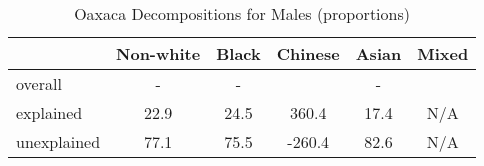 \begin{table}[htbp]\centering
\caption{Oaxaca Decompositions for Males (proportions)}
\begin{tabular}{l*{5}{c}}
\hline\hline
          &Non-white&    Black&  Chinese&    Asian&    Mixed\\
\hline
overall   &     -    &      -   &         &     -    &         \\
explained &     22.9\sym{***}&     24.5\sym{***}&    360.4\sym{***}&     17.4\sym{***}&    N/A\\
unexplained&     77.1\sym{***}&     75.5\sym{***}&   -260.4\sym{*}&     82.6\sym{***}&     N/A\\
\hline\hline
\end{tabular}
\label{tab:oaxaca_pct_male}
\end{table}
